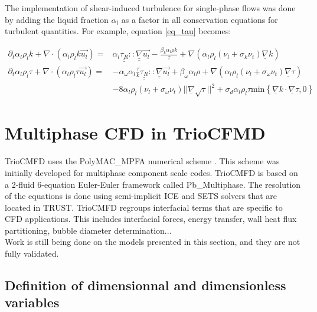 The implementation of shear-induced turbulence for single-phase flows was done by adding the liquid fraction $\alpha_l$ as a factor in all conservation equations for turbulent quantities. For example, equation \ref{eq_tau} becomes:

\begin{equation}
\begin{split}
	\partial_t { \alpha_l } \rho_l k + \nabla \cdot ({ \alpha_l } \rho_l k \vec{u_l}) 
	= & { \alpha_l } \underline{\underline{\tau_R}}::\underline{\underline{\nabla}}\vec{u_l} 
	- \frac{\beta_{k}{ \alpha_l }\rho k}{\tau}
	+ \nabla( { \alpha_l } \rho_l(\nu_l + \sigma_k \nu_t) \underline{\nabla} k)
	\\
	\partial_t { \alpha_l } \rho_l \tau + \nabla \cdot ({ \alpha_l } \rho_l \tau \vec{u_l}) 
	= &	- \alpha_{\omega} { \alpha_l } \frac{\tau}{k}\underline{\underline{\tau_R}}::\underline{\underline{\nabla}}\vec{u_l}
	+ \beta_{\omega}{ \alpha_l }\rho
	+\nabla( { \alpha_l } \rho_l(\nu_l + \sigma_{\omega} \nu_t) \underline{\nabla} \tau) \\
	& - 8 { \alpha_l } \rho_l(\nu_l + \sigma_{\omega} \nu_t) ||\underline{\nabla}\sqrt{\tau}||^2
	+ \sigma_d { \alpha_l } \rho_l \tau \text{min}\left\{\underline{\nabla}k \cdot \underline{\nabla} \tau, 0\right\}
\end{split}
\end{equation}

\section{Multiphase CFD in TrioCFMD}

TrioCMFD uses the PolyMAC\_MPFA numerical scheme \cite{Gerschenfeld_PolyMAC2018, Gerschenfeld_PolyMAC2022}. This scheme was initially developed for multiphase component scale codes. TrioCMFD is based on a 2-fluid 6-equation Euler-Euler framework called Pb\_Multiphase. The resolution of the equations is done using semi-implicit ICE and SETS solvers that are located in TRUST. TrioCMFD regroups interfacial terms that are specific to CFD applications. This includes interfacial forces, energy transfer, wall heat flux partitioning, bubble diameter determination... \\

Work is still being done on the models presented in this section, and they are not fully validated.

\subsection{Definition of dimensionnal and dimensionless variables}

